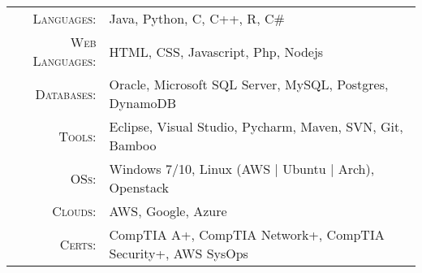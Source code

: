 %
%
%

\renewcommand{\arraystretch}{1.1}

	\begin{tabular}{>{}r>{}p{13cm}}
		\textsc{Languages:}			&   Java, Python, C, C++, R, C\#\\
		\textsc{Web Languages:}     &   HTML, CSS,  Javascript, Php, Nodejs\\
		\textsc{Databases:}			&   Oracle, Microsoft SQL Server, MySQL, Postgres, DynamoDB \\
		\textsc{Tools:}				&   Eclipse, Visual Studio, Pycharm, Maven, SVN, Git, Bamboo\\
		\textsc{OSs:}				&   Windows 7/10,  Linux (AWS | Ubuntu | Arch), Openstack\\
		\textsc{Clouds:}			&   AWS, Google, Azure\\
		\textsc{Certs:}				&   CompTIA A+, CompTIA Network+, CompTIA Security+, AWS SysOps
	
		
	\end{tabular} 